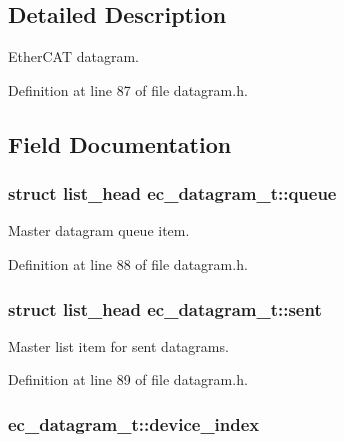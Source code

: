 \subsection{Detailed Description}
Ether\-C\-A\-T datagram. 

Definition at line 87 of file datagram.\-h.



\subsection{Field Documentation}
\subsubsection[{queue}]{\setlength{\rightskip}{0pt plus 5cm}struct list\-\_\-head ec\-\_\-datagram\-\_\-t\-::queue}\label{structec__datagram__t_a6e6acbb9301ecc6f382740eae531f00a}


Master datagram queue item. 



Definition at line 88 of file datagram.\-h.

\subsubsection[{sent}]{\setlength{\rightskip}{0pt plus 5cm}struct list\-\_\-head ec\-\_\-datagram\-\_\-t\-::sent}\label{structec__datagram__t_aa1ff1596b3e36d19123be609dbf3de46}


Master list item for sent datagrams. 



Definition at line 89 of file datagram.\-h.

\subsubsection[{device\-\_\-index}]{ ec\-\_\-datagram\-\_\-t\-::device\-\_\-index}\label{structec__datagram__t_a9804c4ebdbd3e7ff5b55bfe3aa33bbef}


